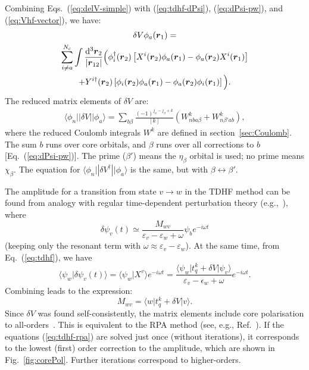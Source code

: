 \documentclass[10pt,twocolumn,a4paper]{article}%
\newcommand{\bra}[1]{\ensuremath{\langle #1|}}	%
\newcommand{\ket}[1]{\ensuremath{|#1\rangle}}
\newcommand{\braket}[1]{\ensuremath{\langle #1\rangle}}	%
\renewcommand{\v}[1]{\ensuremath{\boldsymbol{#1}}}		%
\newcommand{\be}{\begin{equation}}
\newcommand{\ee}{\end{equation}}
\def\d{\ensuremath{{\rm d}}}
\def\e{\ensuremath{\epsilon}}
\def\en{\ensuremath{\varepsilon}}
\renewcommand{\b}{\ensuremath{\beta}}
\newcommand{\w}{\ensuremath{\omega}}
\begin{document}
Combining Eqs.~(\ref{eq:delV-simple}) with (\ref{eq:tdhf-dPsi}), (\ref{eq:dPsi-pw}), and (\ref{eq:Vhf-vector}), we have:
\begin{multline}\label{eq:del-Vhf-vector}
\delta V\phi_a(\v{r}_1) = \\
\sum_{i\neq a}^{N_c}\int \frac{\d^3\v{r}_2}{|\v{r}_{12}|}
\Big(
\phi_i^\dag(\v{r}_2)\left[
X^i(\v{r}_2)\phi_a(\v{r}_1)
-\phi_a(\v{r}_2)  X^i(\v{r}_1)\right]\\
%
+Y^{i\dag}(\v{r}_2)\left[
\phi_i(\v{r}_2)  \phi_a(\v{r}_1)
-\phi_a(\v{r}_2) \phi_i(\v{r}_1)\right]
\Big).
\end{multline}
%
The reduced matrix elements of $\delta V$ are:
\begin{multline}\label{eq:dV-rme}
\bra{\phi_n}|\delta V|\ket{\phi_a}
 = 
 \sum_{b\beta}\frac{(-1)^{j_n-j_\beta+k}}{[k]} 
\left(
W^k_{nba\b} + W^k_{n\b'ab}\right),
\end{multline}
where the reduced Coulomb integrals $W^k$ are defined in section~\ref{sec:Coulomb}.
The sum $b$ runs over core orbitals, and $\beta$ runs over all corrections to $b$ [Eq.~(\ref{eq:dPsi-pw})].
The prime ($\beta'$) means the $\eta_\beta$ orbital is used; no prime means $\chi_\beta$.
The equation for $\bra{\phi_n}|\delta V^\dag|\ket{\phi_a}$ is the same, but with $\beta\leftrightarrow\beta'$.



The amplitude for a transition from state $v\to w$ in the TDHF method can be found from analogy with regular time-dependent perturbation theory (e.g.,~\cite{Sakurai2011}), where 
\[
\delta\psi_v(t) \simeq \frac{M_{wv}}{\en_v-\en_w+\w}\psi_be^{-i\w t}
\]
(keeping only the resonant term with $\w\approx\en_v-\en_w$).
At the same time, from Eq.~(\ref{eq:tdhf}), we have
\be
\braket{\psi_w | \delta\psi_v(t)} = \braket{\psi_w | X^v}e^{-i\w t}
= \frac{\bra{\psi_w} t^k_q + \delta V \ket{\psi_v}}{\en_v - \e_w + \w}e^{-i\w t}.
\ee
Combining leads to the expression: 
\be
M_{wv} = \bra{w}t^k_q + \delta V\ket{v}.
\ee
Since $\delta V$ was found self-consistently, the matrix elements include core polarisation  to all-orders~\cite{DzubaHFS1984,Dzuba1987jpbRPA}.
This is equivalent to the RPA method (see, e.g., Ref.~\cite{JohnsonBook2007}).
If the equations (\ref{eq:tdhf-rpa}) are solved just once (without iterations), it corresponds to the lowest (first) order correction to the amplitude, which are shown in Fig.~\ref{fig:corePol}.
Further iterations correspond to higher-orders.
\end{document}
